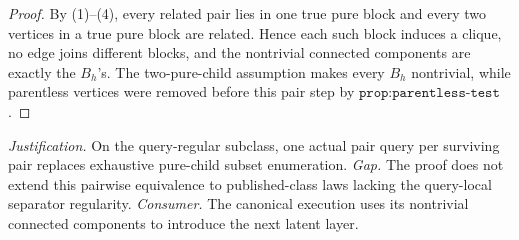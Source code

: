 \documentclass{article}
\begin{document}
\begin{proof}
By (1)--(4), every related pair lies in one true pure block and every two vertices in a true pure block are related.  Hence each such block induces a clique, no edge joins different blocks, and the nontrivial connected components are exactly the \(B_h\)'s.  The two-pure-child assumption makes every \(B_h\) nontrivial, while parentless vertices were removed before this pair step by \(\texttt{prop:parentless-test}\).
\end{proof}
\par\smallskip\noindent \textit{Justification.} On the query-regular subclass, one actual pair query per surviving pair replaces exhaustive pure-child subset enumeration. \textit{Gap.} The proof does not extend this pairwise equivalence to published-class laws lacking the query-local separator regularity. \textit{Consumer.} The canonical execution uses its nontrivial connected components to introduce the next latent layer.
\end{document}
